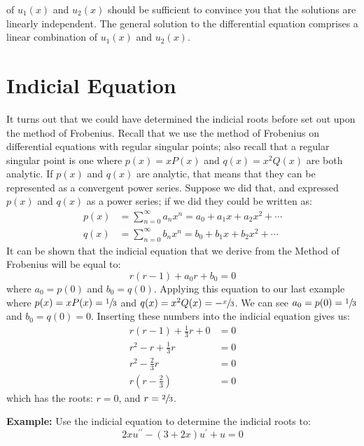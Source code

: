  of $u_1(x)$ and $u_2(x)$ should be sufficient to convince you that the solutions are linearly independent.  The general solution to the differential equation comprises a linear combination of $u_1(x)$ and $u_2(x)$.

\vspace{5.0cm}

\section{Indicial Equation}
It turns out that we could have determined the indicial roots before set out upon the method of Frobenius.  Recall that we use the method of Frobenius on differential equations with regular singular points; also recall that a regular singular point is one where $p(x)=xP(x)$ and $q(x)=x^2Q(x)$ are both analytic.  If $p(x)$ and $q(x)$ are analytic, that means that they can be represented as a convergent power series.  Suppose we did that, and expressed $p(x)$ and $q(x)$ as a power series; if we did they could be written as:
\begin{align*}
p(x) &= \sum\limits_{n=0}^{\infty} a_nx^n = a_0 + a_1x + a_2x^2 + \cdots \\
q(x) &= \sum\limits_{n=0}^{\infty} b_nx^n = b_0 + b_1x + b_2x^2 + \cdots
\end{align*}
It can be shown that the indicial equation that we derive from the Method of Frobenius will be equal to:
\begin{equation*}
r(r-1)+a_0r + b_0 = 0
\end{equation*}
where $a_0 = p(0)$ and $b_0 = q(0)$.  Applying this equation to our last example where $p(x)=xP(x) = \sfrac{1}{3}$ and $q(x) = x^2 Q(x) = -\sfrac{x}{3}$.  We can see $a_0 = p(0) = \sfrac{1}{3}$ and $b_0 = q(0) = 0$.  Inserting these numbers into the indicial equation gives us:
\begin{align*}
r(r-1)+\frac{1}{3}r + 0 &= 0 \\
r^2-r + \frac{1}{3}r &= 0 \\
r^2 - \frac{2}{3}r &= 0 \\
r(r-\frac{2}{3}) &=0
\end{align*}
which has the roots: $r = 0$, and $r = \sfrac{2}{3}$.

\vspace{0.5cm}

\noindent\textbf{Example:}  Use the indicial equation to determine the indicial roots to:
\begin{equation*}
2xu^{\prime \prime} - (3+2x)u^{\prime} + u = 0
\end{equation*}


